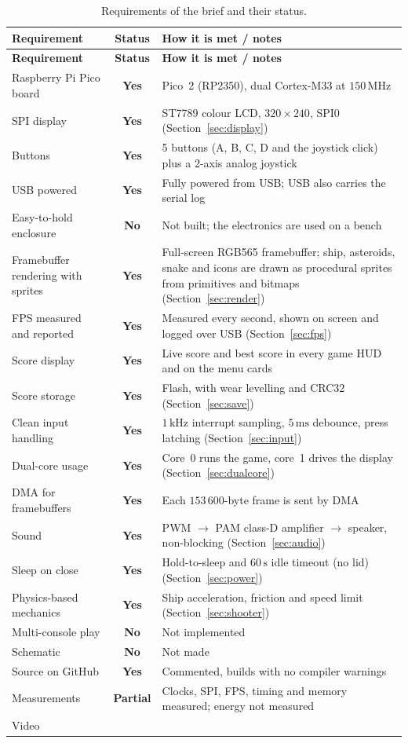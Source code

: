 \documentclass[11pt,a4paper]{article}
\newcommand{\tbd}[1]{\fbox{\textcolor{todo}{\textbf{#1}}}}
\newcommand{\yes}{\textcolor{okgreen}{\textbf{Yes}}}
\newcommand{\no}{\textcolor{todo}{\textbf{No}}}
\newcommand{\partly}{\textcolor{warnorange}{\textbf{Partial}}}
\newcommand{\unit}[2]{\ensuremath{#1\,\mathrm{#2}}}
\begin{document}
\begin{longtable}{p{4.6cm} c p{8.6cm}}
\caption{Requirements of the brief and their status.}\label{tab:compliance}\\
\toprule
\textbf{Requirement} & \textbf{Status} & \textbf{How it is met / notes} \\
\midrule\endfirsthead
\toprule
\textbf{Requirement} & \textbf{Status} & \textbf{How it is met / notes} \\
\midrule\endhead
Raspberry Pi Pico board & \yes & Pico~2 (RP2350), dual Cortex-M33 at \unit{150}{MHz} \\
SPI display & \yes & ST7789 colour LCD, $320\times240$, SPI0 (Section~\ref{sec:display}) \\
Buttons & \yes & 5 buttons (A, B, C, D and the joystick click) plus a 2-axis analog joystick \\
USB powered & \yes & Fully powered from USB; USB also carries the serial log \\
Easy-to-hold enclosure & \no & Not built; the electronics are used on a bench \\
Framebuffer rendering with sprites & \yes & Full-screen RGB565 framebuffer; ship, asteroids, snake and icons are drawn as procedural sprites from primitives and bitmaps (Section~\ref{sec:render}) \\
FPS measured and reported & \yes & Measured every second, shown on screen and logged over USB (Section~\ref{sec:fps}) \\
Score display & \yes & Live score and best score in every game HUD and on the menu cards \\
Score storage & \yes & Flash, with wear levelling and CRC32 (Section~\ref{sec:save}) \\
Clean input handling & \yes & \unit{1}{kHz} interrupt sampling, \unit{5}{ms} debounce, press latching (Section~\ref{sec:input}) \\
Dual-core usage & \yes & Core~0 runs the game, core~1 drives the display (Section~\ref{sec:dualcore}) \\
\midrule
DMA for framebuffers & \yes & Each $153\,600$-byte frame is sent by DMA \\
Sound & \yes & PWM $\rightarrow$ PAM class-D amplifier $\rightarrow$ speaker, non-blocking (Section~\ref{sec:audio}) \\
Sleep on close & \yes & Hold-to-sleep and \unit{60}{s} idle timeout (no lid) (Section~\ref{sec:power}) \\
Physics-based mechanics & \yes & Ship acceleration, friction and speed limit (Section~\ref{sec:shooter}) \\
Multi-console play & \no & Not implemented \\
\midrule
Schematic & \no & Not made \\
Source on GitHub & \yes & Commented, builds with no compiler warnings \\
Measurements & \partly & Clocks, SPI, FPS, timing and memory measured; energy not measured \\
Video & \tbd{To add} & \\
\bottomrule
\end{longtable}
\end{document}
